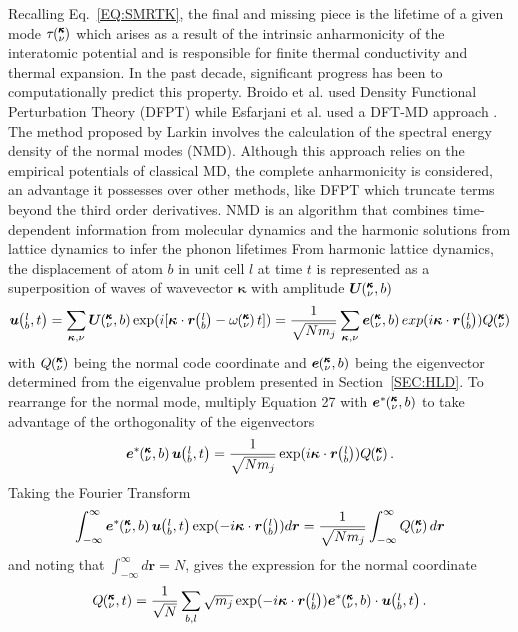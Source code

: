Recalling Eq.~\ref{EQ:SMRTK}, the final and missing piece is the lifetime of a given mode $\tau\mspace{-4.0mu}\left(\mspace{-8.0mu} \begin{smallmatrix}&\pmb{\kappa} \\&\nu\end{smallmatrix} \mspace{-3.0mu}\right)$ which arises as a result of the intrinsic anharmonicity of the interatomic potential and is responsible for finite thermal conductivity and thermal expansion. In the past decade, significant progress has been to computationally predict this property. Broido et al. used Density Functional Perturbation Theory (DFPT) \cite{Broido1} while Esfarjani et al. used a DFT-MD approach \cite{PhysRevB.84.085204}. The method proposed by Larkin \cite{jason_inpress} involves the calculation of the spectral energy density of the normal modes (NMD). Although this approach relies on the empirical potentials of classical MD, the complete anharmonicity is considered, an advantage it possesses over other methods, like DFPT which truncate terms beyond the third order derivatives. NMD is an algorithm that combines time-dependent information from molecular dynamics and the harmonic solutions from lattice dynamics to infer the phonon lifetimes From harmonic lattice dynamics, the displacement of atom $b$ in unit cell $l$ at time $t$ is represented as a superposition of waves of wavevector $\bm{\kappa}$ with amplitude $\bm{U}\mspace{-4.0mu}\left(\mspace{-8.0mu} \begin{smallmatrix} &\pmb{\kappa} \\ &\nu \end{smallmatrix} \mspace{-2.0mu},b\right)$
%
\begin{equation}
\bm{u}\lbt=\sum_{\bm{\kappa},\nu}\bm{U}\kvb \exp(i[\bm{\kappa}\cdot\bm{r}\lb-\omega\kv t])=\frac{1}{\sqrt{Nm_j}}\sum_{\bm{\kappa},\nu}\bm{e}\kvb exp(i\bm{\kappa}\cdot\bm{r}\lb)Q\kv
\end{equation}
%
with $Q\mspace{-4.0mu}\left(\mspace{-8.0mu} \begin{smallmatrix}&\pmb{\kappa} \\&\nu\end{smallmatrix} \mspace{-3.0mu}\right)$ being the normal code coordinate and $\bm{e}\mspace{-4.0mu}\left(\mspace{-8.0mu} \begin{smallmatrix} &\pmb{\kappa} \\ &\nu \end{smallmatrix} \mspace{-2.0mu},b\right)$ being the eigenvector determined from the eigenvalue problem presented in Section~\ref{SEC:HLD}. To rearrange for the normal mode, multiply Equation 27 with $\bm{e}^*\mspace{-4.0mu}\left(\mspace{-8.0mu} \begin{smallmatrix} &\pmb{\kappa} \\ &\nu \end{smallmatrix} \mspace{-2.0mu},b\right)$ to take advantage of the orthogonality of the eigenvectors
%
\begin{equation}
\bm{e}^*\kvb\bm{u}\lbt=\frac{1}{\sqrt{Nm_j}}\exp(i\bm{\kappa}\cdot\bm{r}\lb)Q\kv.
\end{equation}
%
Taking the Fourier Transform
%
\begin{equation}
\int_{-\infty}^{\infty}\bm{e}^*\kvb\bm{u}\lbt \exp(-i\bm{\kappa}\cdot\bm{r}\lb)d\bm{r}=\frac{1}{\sqrt{Nm_j}}\int_{-\infty}^{\infty}Q\kv d\bm{r}
\end{equation}
%
and noting that $\int_{-\infty}^{\infty}d\bm{r}=N$, gives the expression for the normal coordinate
%
\begin{equation}
Q\kvt=\frac{1}{\sqrt{N}}\sum_{b,l}\sqrt{m_j}\exp(-i\bm{\kappa}\cdot\bm{r}\lb)\bm{e}^*\kvb\cdot\bm{u}\lbt.
\end{equation}
